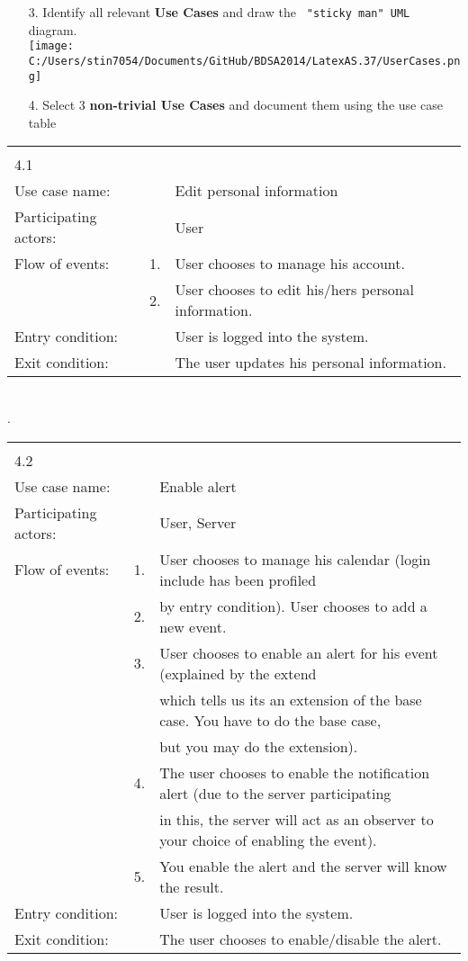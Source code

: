 \documentclass{article}
\begin{document}
	\begin{enumerate}
		\item[3.] Identify all  relevant \textbf{Use Cases} and draw the \verb= "sticky man" UML= diagram.\\
		\texttt{[image: C:/Users/stin7054/Documents/GitHub/BDSA2014/LatexAS.37/UserCases.png]}\\
		\pagebreak{}
		\item[4.] Select 3 \textbf{non-trivial Use Cases} and document them using the use case table\\
	\end{enumerate}
\begin{tabular}{l r @{} l}
	\multicolumn{2}{c}{} \\
	4.1&&\\
	\hline
	Use case name:	&&Edit personal information\\
	\hline
	Participating actors:&&User \\
	\hline
	Flow of events:	&1.&User chooses to manage his account.\\
				&2.&User chooses to edit his/hers personal information.\\
	\hline
	Entry condition:	&&User is logged into the system.\\
	\hline
	Exit condition:	&&The user updates his personal information.\\
	\hline
\end{tabular}
	\\
	.\\
\begin{tabular}{l r @{} l}
	\multicolumn{2}{c}{} \\
	4.2&&\\
	\hline
	Use case name:	&&Enable alert\\
	\hline
	Participating actors:&&User, Server \\
	\hline
	Flow of events:	&1.&User chooses to manage his calendar (login include has been profiled\\
				&2.&by entry condition). User chooses to add a new event.\\
				&3.&User chooses to enable an alert for his event (explained by the \flqq extend\frqq\\
					&& which tells us its an extension of the base case. You have to do the base case,\\
					&& but you may do the extension).\\
				&4.&The user chooses to enable the notification alert (due to the server participating\\
					&& in this, the server will act as an observer to your choice of enabling the event).\\
				&5.&You enable the alert and the server will know the result.\\
	\hline
	Entry condition:	&&User is logged into the system.\\
	\hline
	Exit condition:	&&The user chooses to enable/disable the alert.\\
	\hline
\end{tabular}
\end{document}
